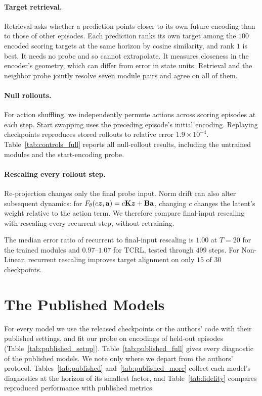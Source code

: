 \paragraph{Target retrieval.} Retrieval asks whether a prediction points closer to its own future encoding than to those of other episodes. Each prediction ranks its own target among the $100$ encoded scoring targets at the same horizon by cosine similarity, and rank $1$ is best. It needs no probe and so cannot extrapolate. It measures closeness in the encoder's geometry, which can differ from error in state units. Retrieval and the neighbor probe jointly resolve seven module pairs and agree on all of them.

\paragraph{Null rollouts.}
For action shuffling, we independently permute actions across scoring episodes at each step. Start swapping uses the preceding episode's initial encoding. Replaying checkpoints reproduces stored rollouts to relative error $1.9\times10^{-4}$. Table~\ref{tab:controls_full} reports all null-rollout results, including the untrained modules and the start-encoding probe.





\paragraph{Rescaling every rollout step.}
Re-projection changes only the final probe input. Norm drift can also alter subsequent dynamics: for $F_\theta(c\bm{z},\mathbf a)=c\mathbf{K}\bm{z}+\mathbf{B}\mathbf a$, changing $c$ changes the latent's weight relative to the action term. We therefore compare final-input rescaling with rescaling every recurrent step, without retraining.

The median error ratio of recurrent to final-input rescaling is $1.00$ at $T=20$ for the trained modules and $0.97$--$1.07$ for TCRL, tested through $499$ steps. For Non-Linear, recurrent rescaling improves target alignment on only $15$ of $30$ checkpoints.

\section{The Published Models}
\label{app:published}
For every model we use the released checkpoints or the authors' code with their published settings, and fit our probe on encodings of held-out episodes (Table~\ref{tab:published_setup}). Table~\ref{tab:published_full} gives every diagnostic of the published models. We note only where we depart from the authors' protocol. Tables~\ref{tab:published} and~\ref{tab:published_more} collect each model's diagnostics at the horizon of its smallest factor, and Table~\ref{tab:fidelity} compares reproduced performance with published metrics.

